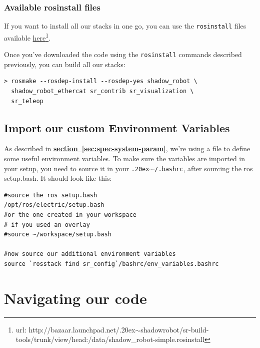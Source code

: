 \documentclass[12pt]{article}
\newcommand{\linuxtilde}{\raise.20ex\hbox{$\scriptstyle\mathtt{\sim}$}}
\newcommand{\link}[1]{\hyperref[sec:#1]{\textbf{section~\ref*{sec:#1}}}}
\begin{document}
\subsubsection{Available rosinstall files}
\par If you want to install all our stacks in one go, you can use the \texttt{rosinstall} files available \href{http://bazaar.launchpad.net/~shadowrobot/sr-build-tools/trunk/view/head:/data/shadow_robot-simple.rosinstall}{here}\footnote{url: http://bazaar.launchpad.net/\linuxtilde shadowrobot/sr-build-tools/trunk/view/head:/data/shadow\_robot-simple.rosinstall}.\\

\par Once you've downloaded the code using the \texttt{rosinstall} commands described previously, you can build all our stacks:
  \begin{lstlisting}[escapeinside='']
> rosmake --rosdep-install --rosdep-yes shadow_robot \
  shadow_robot_ethercat sr_contrib sr_visualization \
  sr_teleop
  \end{lstlisting}

\subsection{Import our custom Environment Variables}
\label{sec:import-vars}
\par As described in \link{spec-system-param}, we're using a file to define some useful environment variables. To make sure the variables are imported in your setup, you need to source it in your \texttt{\linuxtilde/.bashrc}, after sourcing the ros setup.bash. It should look like this:
  \begin{lstlisting}[title={\textbf{\linuxtilde/.bashrc}}, upquote=true]
#source the ros setup.bash
/opt/ros/electric/setup.bash
#or the one created in your workspace
# if you used an overlay
#source ~/workspace/setup.bash

#now source our additional environment variables
source `rosstack find sr_config`/bashrc/env_variables.bashrc
  \end{lstlisting}

\newpage

\section{Navigating our code}
\label{sec:navigate}
\end{document}
